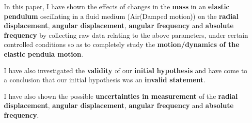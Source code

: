 {In this paper, I have shown the effects of changes in the \textbf{mass} in an \textbf{elastic pendulum} oscillating in a fluid medium (Air(Damped motion)) on the \textbf{radial displacement}, \textbf{angular displacement}, \textbf{angular frequency} and \textbf{absolute frequency} by collecting raw data relating to the above parameters, under certain controlled conditions so as to completely study the \textbf{motion/dynamics of the elastic pendula motion}.}

{I have also investigated the \textbf{validity} of our \textbf{initial hypothesis} and have come to a conclusion that our initial hypothesis was an \textbf{invalid statement}.}

{I have also shown the possible \textbf{uncertainties in measurement} of the \textbf{radial displacement}, \textbf{angular displacement}, \textbf{angular frequency} and \textbf{absolute frequency}.}


